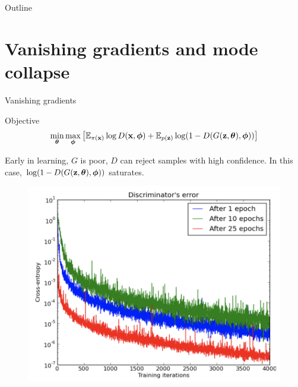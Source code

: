\begin{frame}{Outline}
	\tableofcontents
\end{frame}
\section{Vanishing gradients and mode collapse}
\begin{frame}{Vanishing gradients}
	\begin{block}{Objective}
		\vspace{-0.4cm}
		\[
			\min_{\boldsymbol{\theta}} \max_{\boldsymbol{\phi}} \left[ \mathbb{E}_{\pi(\mathbf{x})} \log D(\mathbf{x}, \boldsymbol{\phi}) + \mathbb{E}_{p(\mathbf{z})} \log (1 - D(G(\mathbf{z}, \boldsymbol{\theta}), \boldsymbol{\phi})) \right]
		\]
		\vspace{-0.4cm}
	\end{block}
	Early in learning, $G$ is poor, $D$ can reject samples with high confidence. In this case, $\log (1 - D(G(\mathbf{z}, \boldsymbol{\theta}), \boldsymbol{\phi}))$ saturates.
	\begin{minipage}[t]{0.5\columnwidth}
		\begin{figure}
			\centering
			\includegraphics[width=0.9\linewidth]{figs/vanishing_gradients_1}
		\end{figure}
	\end{minipage}%
	\begin{minipage}[t]{0.5\columnwidth}
		\begin{figure}
			\centering

\end{figure}
\end{minipage}
\end{frame}
